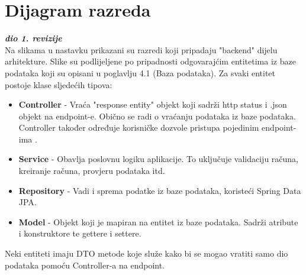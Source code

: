 			\eject
			
			
		\section{Dijagram razreda}
		
			
			\textbf{\textit{dio 1. revizije}}\\
			

Na slikama u nastavku prikazani su razredi koji pripadaju "backend" dijelu arhitekture. Slike su podlijeljene po pripadnosti odgovarajćim entitetima iz baze podataka koji su opisani u poglavlju 4.1 (Baza podataka). Za svaki entitet postoje klase sljedećih tipova:
\begin{itemize}
	        \item \textbf{Controller} - Vraća "response entity" objekt koji sadrži http status i .json objekt na endpoint-e. Obično se radi o vraćanju podataka iz baze podataka. Controller također određuje korisničke dozvole pristupa pojedinim endpoint-ima  .
	        \item \textbf{Service} - Obavlja poslovnu logiku aplikacije. To uključuje validaciju računa, kreiranje računa, provjeru podataka itd.
	        \item \textbf{Repository} - Vadi i sprema podatke iz baze podataka, koristeći Spring Data JPA.
	        \item \textbf{Model} - Objekt koji je mapiran na entitet iz baze podataka. Sadrži atribute i konstruktore te gettere i settere.
	    \end{itemize}
	    
Neki entiteti imaju DTO metode koje služe kako bi se mogao vratiti samo dio podataka pomoću Controller-a na endpoint.
	    

